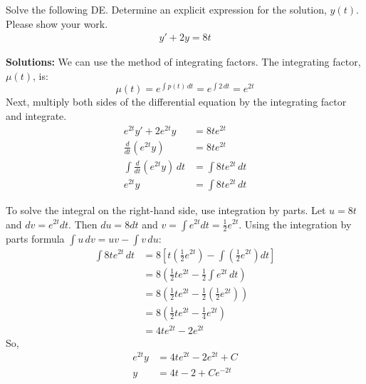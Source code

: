 \ifnum {}
\question[5] Solve the following DE. Determine an explicit expression for the solution, $y(t)$. Please show your work. 
\begin{align*}
    y'+2y=8t
\end{align*}
\ifnum {} {\color{DarkBlue} 
\textbf{Solutions:} We can use the method of integrating factors. The integrating factor, \( \mu(t) \), is:
\[
\mu(t) = e^{\int p(t) \, dt} = e^{\int 2 \, dt} = e^{2t}
\]
Next, multiply both sides of the differential equation by the integrating factor and integrate. 
\begin{align}
e^{2t} y' + 2 e^{2t} y &= 8t e^{2t}\\
\frac{d}{dt} \left( e^{2t} y \right) &= 8t e^{2t}\\
\int \frac{d}{dt} \left( e^{2t} y \right) \, dt &= \int 8t e^{2t} \, dt\\
e^{2t} y &= \int 8t e^{2t} \, dt    
\end{align}

To solve the integral on the right-hand side, use integration by parts. Let \( u = 8t \) and \( dv = e^{2t} dt \). Then \( du = 8 dt \) and \( v = \int e^{2t} dt = \frac{1}{2} e^{2t} \). Using the integration by parts formula \(\int u \, dv = uv - \int v \, du\):
\begin{align}
    \int 8t e^{2t} \, dt 
    &= 8 \left[ t \left( \frac{1}{2} e^{2t} \right) - \int \left( \frac{1}{2} e^{2t} \right) dt \right]\\
    &= 8 \left( \frac{1}{2} t e^{2t} - \frac{1}{2} \int e^{2t} \, dt \right)\\
    &= 8 \left( \frac{1}{2} t e^{2t} - \frac{1}{2} \left( \frac{1}{2} e^{2t} \right) \right) \\
    &= 8 \left( \frac{1}{2} t e^{2t} - \frac{1}{4} e^{2t} \right)\\ 
    &= 4 t e^{2t} - 2 e^{2t}
\end{align}
So,
\begin{align}
    e^{2t} y &= 4 t e^{2t} - 2 e^{2t} + C    \\ 
    y &= 4 t - 2 + C e^{-2t} 
\end{align}

} 
\else 
\fi
\fi



